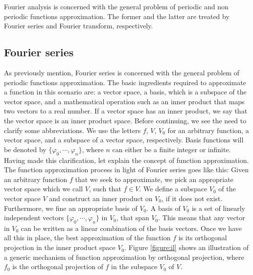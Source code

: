\documentclass[../Main/thesis.tex]{subfiles}
\begin{document}
\justify
Fourier analysis is concerned with the general problem of periodic and non periodic functions approximation. The former and the latter are treated by Fourier series and Fourier transform, respectively. %

\subsection{Fourier series}
As previously mention, Fourier series is concerned with the general problem of periodic functions approximation. The basic ingredients required to approximate a function in this scenario are: a vector space, a basis, which is a subspace of the vector space, and a mathematical operation such as an inner product that maps two vectors to a real number. If a vector space has an inner product, we say that the vector space is an inner product space. 
\justify
Before continuing, we see the need to clarify some abbreviations. We use the letters $f$, $V$, $V_{0}$ for an arbitrary function, a vector space, and a subspace of a vector space, respectively.
Basis functions will be denoted by $\{  \varphi_{0}, \cdots,\varphi_{n}\}$, where $n$ can either be a finite integer or infinite. Having made this clarification, let explain the concept of function approximation. 
\justify
The function approximation process in light of Fourier series goes like this: Given an arbitrary function $f$ that we seek to approximate, we pick an appropriate vector space which we call $V$, such that $f\in V$. We define a subspace $V_{0}$ of the vector space $V$ and construct an inner product on $V_{0}$, if it does not exist. Furthermore, we fine an appropriate basis of $V_{0}$.  A basis of $V_{0}$ is a set of linearly independent vectors   $\{  \varphi_{0}, \cdots,\varphi_{n}\}$ in $V_{0}$, that span $V_{0}$. 
\justify
This means that any vector in $V_{0}$ can be written as a linear combination of the basis vectors. Once we have all this in place, the best approximation of the function $f$ is its orthogonal projection in the inner product space $V_{0}$. Figure \ref{figure:il} shows an illustration of a generic mechanism of function approximation by orthogonal projection, where $f_{0}$ is the orthogonal projection of $f$ in the subspace $V_{0}$ of $V$.
\end{document}
